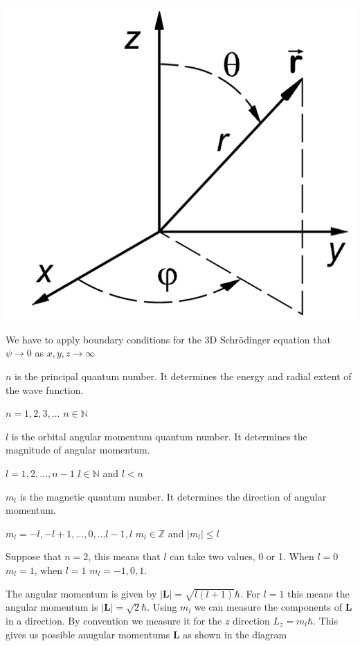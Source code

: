 \documentclass{article}
\renewcommand{\vec}[1]{\underline{#1}}
\renewcommand{\vec}[1]{\bm{#1}}
\newcommand{\vv}[1]{\vec{#1}}
\newcommand{\bb}[1]{\mathbb{#1}}
\newcommand{\hb}{\hbar}
\begin{document}
\section{}

\begin{center}
\includegraphics[scale = 0.2]{SphericalPolarCoordinates}
\end{center}


We have to apply boundary conditions for the 3D Schr\"odinger equation that \(\psi\to0\) as \(x,y,z\to\infty\)

\(n\) is the principal quantum number. It determines the energy and radial extent of the wave function.

\(n=1,2,3,\dots\) \(n\in\bb N\)

\(l\) is the orbital angular momentum quantum number. It determines the magnitude of angular momentum.

\(l=1,2,\dots,n-1\) \(l\in\bb N\) and \(l<n\)

\(m_l\) is the magnetic quantum number. It determines the direction of angular momentum.

\(m_l=-l,-l+1,\dots,0,\dots l-1,l\) \(m_l\in\bb Z\) and \(|m_l|\le l\)

Suppose that \(n=2\), this means that \(l\) can take two values, 0 or 1. When \(l=0\) \(m_l=1\), when \(l=1\) \(m_l=-1,0,1\).

The angular momentum is given by \(|\vv L|=\sqrt{l(l+1)}\hb\). For \(l=1\) this means the angular momentum is \(|\vv L|=\sqrt{2}\hb\). Using \(m_l\) we can measure the components of \(\vv L\) in a direction. By convention we measure it for the \(z\) direction \(L_z=m_l\hb\). This gives us possible anugular momentums \(\vv L\) as shown in the diagram
\end{document}
